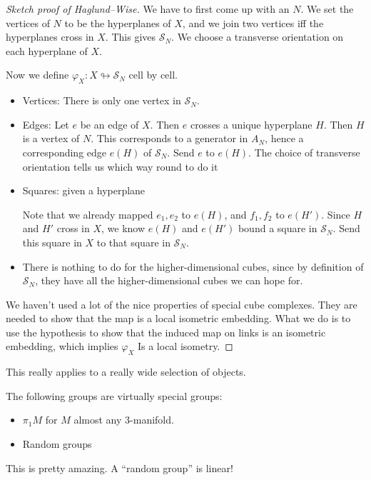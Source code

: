 \documentclass[a4paper]{article}
\begin{document}
\begin{proof}[Sketch proof of Haglund--Wise]
  We have to first come up with an $N$. We set the vertices of $N$ to be the hyperplanes of $X$, and we join two vertices iff the hyperplanes cross in $X$. This gives $\mathcal{S}_N$. We choose a transverse orientation on each hyperplane of $X$.

  Now we define $\varphi_X: X \looparrowright \mathcal{S}_N$ cell by cell.
  \begin{itemize}
    \item Vertices: There is only one vertex in $\mathcal{S}_N$.
    \item Edges: Let $e$ be an edge of $X$. Then $e$ crosses a unique hyperplane $H$. Then $H$ is a vertex of $N$. This corresponds to a generator in $A_N$, hence a corresponding edge $e(H)$ of $\mathcal{S}_N$. Send $e$ to $e(H)$. The choice of transverse orientation tells us which way round to do it
    \item Squares: given a hyperplane
      \begin{center}
      \end{center}
      Note that we already mapped $e_1, e_2$ to $e(H)$, and $f_1, f_2$ to $e(H')$. Since $H$ and $H'$ cross in $X$, we know $e(H)$ and $e(H')$ bound a square in $\mathcal{S}_N$. Send this square in $X$ to that square in $\mathcal{S}_N$.
    \item There is nothing to do for the higher-dimensional cubes, since by definition of $\mathcal{S}_N$, they have all the higher-dimensional cubes we can hope for.
  \end{itemize}
  We haven't used a lot of the nice properties of special cube complexes. They are needed to show that the map is a local isometric embedding. What we do is to use the hypothesis to show that the induced map on links is an isometric embedding, which implies $\varphi_X$ Is a local isometry.
\end{proof}

This really applies to a really wide selection of objects.
\begin{eg}
  The following groups are virtually special groups:
  \begin{itemize}
    \item $\pi_1 M$ for $M$ almost any $3$-manifold.
    \item Random groups
  \end{itemize}
\end{eg}
This is pretty amazing. A ``random group'' is linear!
\printindex
\end{document}
